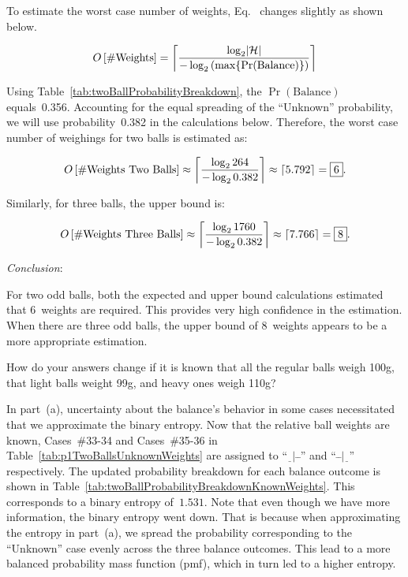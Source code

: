   To estimate the worst case number of weights, Eq.~ changes slightly as shown below.

  \begin{equation}\label{eq:p1NumbWeightsWorstCase}
    O\left[\#\text{Weights}\right] = \ceil*{\frac{\log_{2} \abs{\mathcal{H}}}{-\log_{2} \left(\max \{\Pr(\text{Balance})\} \right) }}
  \end{equation}

  Using Table~\ref{tab:twoBallProbabilityBreakdown}, the $\Pr(\text{Balance})$ equals~0.356.  Accounting for the equal spreading of the ``Unknown'' probability, we will use probability~0.382 in the calculations below.  Therefore, the worst case number of weighings for two balls is estimated as:

  \[ O\left[\#\text{Weights Two Balls}\right] \approx \ceil*{\frac{\log_{2} 264}{-\log_{2} 0.382}} \approx \ceil{5.792} = \boxed{6} \text{.} \]

  \noindent
  Similarly, for three balls, the upper bound is:

  \[ O\left[\#\text{Weights Three Balls}\right] \approx \ceil*{\frac{\log_{2} 1760}{-\log_{2} 0.382}} \approx \ceil{7.766} = \boxed{8} \text{.} \]

  \noindent
  \textit{Conclusion}:

  For two odd balls, both the expected and upper bound calculations estimated that 6~weights are required.  This provides very high confidence in the estimation.  When there are three odd balls, the upper bound of 8~weights appears to be a more appropriate estimation.

\begin{subproblem}
  How do your answers change if it is known that all the regular balls weigh 100g, that light balls weight 99g, and heavy ones weigh 110g?
\end{subproblem}

  In part~(a), uncertainty about the balance's behavior in some cases necessitated that we approximate the binary entropy.  Now that the relative ball weights are known, Cases~\#33-34 and Cases~\#35-36 in Table~\ref{tab:p1TwoBallsUnknownWeights} are assigned to ``${\underline{~~}|\bar{~}\bar{~}}$'' and ``${\bar{~}\bar{~}|\underline{~~}}$'' respectively.  The updated probability breakdown for each balance outcome is shown in Table~\ref{tab:twoBallProbabilityBreakdownKnownWeights}.  This corresponds to a binary entropy of~$1.531$.  Note that even though we have more information, the binary entropy went down.  That is because when approximating the entropy in part~(a), we spread the probability corresponding to the ``Unknown'' case evenly across the three balance outcomes.  This lead to a more balanced probability mass function (pmf), which in turn led to a higher entropy.

